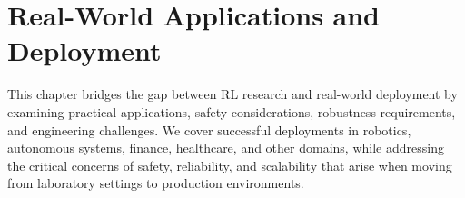 \chapter{Real-World Applications and Deployment}
\label{ch:real-world-applications}

\begin{keyideabox}
This chapter bridges the gap between RL research and real-world deployment by examining practical applications, safety considerations, robustness requirements, and engineering challenges. We cover successful deployments in robotics, autonomous systems, finance, healthcare, and other domains, while addressing the critical concerns of safety, reliability, and scalability that arise when moving from laboratory settings to production environments.
\end{keyideabox}

